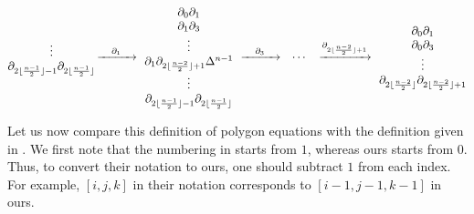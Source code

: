\documentclass[pdftex]{sigma}
\numberwithin{equation}{section}
\theoremstyle{definition}
\begin{document}
\begin{gather*}
\begin{array}{@{}c@{\,}c@{\,}c@{\,}ccc@{\,}c@{}}
\begin{array}{@{}c@{}}
 \vdots\\
 \partial_{2\lfloor\frac{n-1}{2}\rfloor-1}\partial_{2\lfloor\frac{n-1}{2}\rfloor}\\
 \end{array}
 &
 \xrightarrow{\quad\partial_1\quad}
 &
 \begin{array}{c}
 \partial_0\partial_1\\
 \partial_1\partial_3\\
 \vdots\\
 \partial_1\partial_{2\lfloor\frac{n-2}{2}\rfloor+1}\Delta^{n-1}\\
 \vdots\\
 \partial_{2\lfloor\frac{n-1}{2}\rfloor-1}\partial_{2\lfloor\frac{n-1}{2}\rfloor}\\
 \end{array}
 &
 \xrightarrow{\quad\partial_3\quad}
 &
 \cdots
 &
 \xrightarrow{\partial_{2\lfloor\frac{n-2}{2}\rfloor+1}}
 &
 \begin{array}{c@{}}
 \partial_0\partial_1\\
 \partial_0\partial_3\\
 \vdots\\
 \partial_{2\lfloor\frac{n-2}{2}\rfloor}\partial_{2\lfloor\frac{n-2}{2}\rfloor+1}
 \end{array}
 \end{array}
\end{gather*}

Let us now compare this definition of polygon equations with the definition given in \cite{dimakis2015simplex}. We first note that the numbering in \cite{dimakis2015simplex} starts from $1$, whereas ours starts from $0$. Thus, to convert their notation to ours, one should subtract $1$ from each index. For example, $[i,j,k]$ in their notation corresponds to $[i-1,j-1,k-1]$ in ours.
\end{document}
